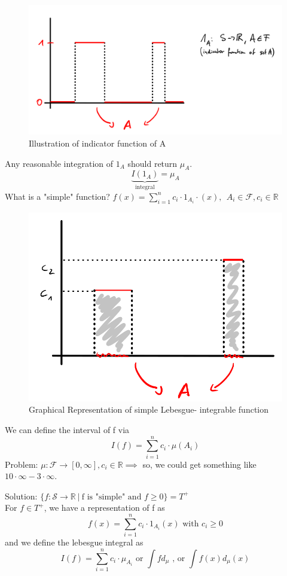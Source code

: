 \documentclass[10pt,a4paper]{article}
\theoremstyle{definition}
\theoremstyle{plain}
\begin{document}
\begin{figure}[H]
	\centering
	\includegraphics[width=0.7\linewidth]{leb_detail}
	\caption{Illustration of indicator function of A}
	\label{fig:lebdetail}
\end{figure}
Any reasonable integration of $1_A$ should return $\mu_A$.
$$ \underbrace{I(1_A)}_{\text{integral}} = \mu_A$$
What is a "simple" function? $ f(x) = \sum_{i=1}^{n} c_i \cdot 1_{A_{i}} \cdot (x), \ \ A_i \in \mathcal{F}, c_i \in \mathbb{R}$\\
\begin{figure}[H]
	\centering
	\includegraphics[width=0.5\linewidth]{simple_leb}
	\caption{Graphical Representation of simple Lebesgue- 	integrable function}
	\label{fig:simplefun}
\end{figure}


We can define the interval of f via
$$ I(f) = \sum_{i = 1}^{n} c_i \cdot \mu(A_i)$$
Problem: $\mu: \mathcal{F} \to [0, \infty], c_i \in \mathbb{R} \implies$ so, we could get something like $10 \cdot \infty - 3 \cdot \infty$.\newline

Solution: $\{f: \mathcal{S} \to \mathbb{R}\ \big| \ \text{f is "simple" and } f \geq 0\} = T^+
$\\

For $f \in T^+$, we have a representation of f as
$$f(x) = \sum_{i=1}^{n} c_i \cdot 1_{A_i}(x) \text{ with } c_i \geq 0$$
and we define the lebesgue integral as 
$$ I(f) = \sum_{i=1}^{n} c_i \cdot \mu_{A_i} \text{ or } \int f d_{\mu} \text{ , or } \int f(x) d_{\mu}(x)$$
\end{document}
